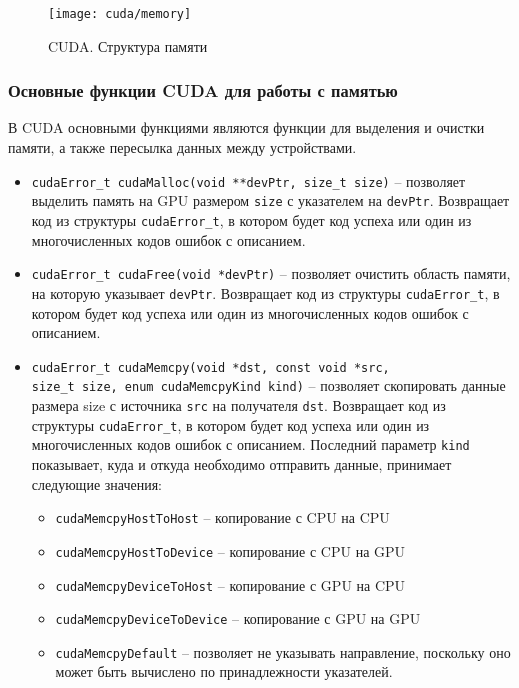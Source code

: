 \begin{figure}[H]
    \texttt{[image: cuda/memory]}
    \caption{CUDA. Структура памяти}
    \label{CudaMemory:image}
\end{figure}

\subsubsection*{Основные функции CUDA для работы с памятью}
В CUDA основными функциями являются функции для выделения и очистки памяти, а также пересылка данных между устройствами.
\begin{itemize}
    \item\texttt{cudaError\_t cudaMalloc(void **devPtr, size\_t size)} -- поз\-во\-ля\-ет выделить память на GPU размером \texttt{size} с указателем на \texttt{devPtr}. Возвращает код из структуры \texttt{cudaError\_t}, в котором будет код успеха или один из многочисленных кодов ошибок с описанием.
    \item\texttt{cudaError\_t cudaFree(void *devPtr)} -- позволяет очистить область памяти, на которую указывает \texttt{devPtr}. Возвращает код из структуры \texttt{cudaError\_t}, в котором будет код успеха или один из многочисленных кодов ошибок с описанием.
    \item\texttt{cudaError\_t cudaMemcpy(void *dst, const void *src, \\ size\_t size, enum cudaMemcpyKind kind)} -- позволяет скопировать данные размера size с источника \texttt{src} на получателя \texttt{dst}. Возвращает код из структуры \texttt{cudaError\_t}, в котором будет код успеха или один из многочисленных кодов ошибок с описанием. Последний параметр \texttt{kind} показывает, куда и откуда необходимо отправить данные, принимает следующие значения:
    \begin{itemize}
        \item \texttt{cudaMemcpyHostToHost} -- копирование с CPU на CPU
        \item \texttt{cudaMemcpyHostToDevice} -- копирование с CPU на GPU
        \item \texttt{cudaMemcpyDeviceToHost} -- копирование с GPU на CPU
        \item \texttt{cudaMemcpyDeviceToDevice} -- копирование с GPU на GPU
        \item \texttt{cudaMemcpyDefault} -- позволяет не указывать направление, поскольку оно может быть вычислено по принадлежности указателей.
    \end{itemize}
\end{itemize}

